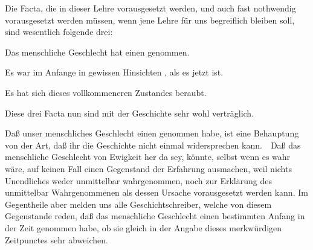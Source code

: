 \vabst {}\par\noindent%
Die Facta, die in dieser Lehre vorausgesetzt werden, und auch fast nothwendig vorausgesetzt werden müssen, wenn jene Lehre für uns begreiflich bleiben soll, sind wesentlich folgende drei:
\begin{aufza}
\item Das menschliche Geschlecht hat einen  genommen.
\item Es war im Anfange in gewissen Hinsichten , als es jetzt ist.
\item Es hat sich dieses vollkommeneren Zustandes  beraubt.
\end{aufza}
Diese drei Facta nun sind mit der Geschichte sehr wohl verträglich.
\begin{aufza}
\item Daß unser menschliches Geschlecht einen  genommen habe, ist eine Behauptung von der Art, daß ihr die Geschichte nicht einmal widersprechen kann.~\ Daß das menschliche Geschlecht von Ewigkeit her da sey, könnte, selbst wenn es wahr wäre, auf keinen Fall einen Gegenstand der Erfahrung ausmachen, weil nichts Unendliches weder unmittelbar wahrgenommen, noch zur Erklärung des unmittelbar Wahrgenommenen als dessen Ursache vorausgesetzt werden kann. Im Gegentheile aber melden uns alle Geschichtschreiber, welche von diesem Gegenstande reden, daß das menschliche Geschlecht einen bestimmten Anfang in der Zeit genommen habe, ob sie gleich in der Angabe dieses merkwürdigen Zeitpunctes sehr abweichen.
\begin{RWanm}

\end{RWanm}
\end{aufza}
